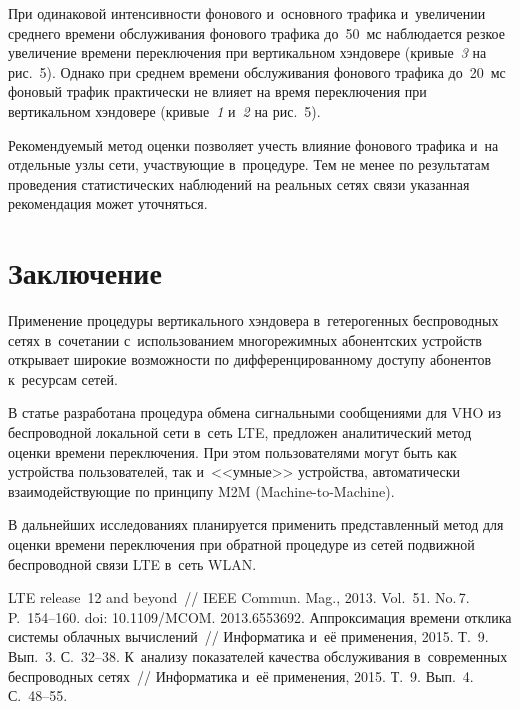 \begin{multicols}{2}
     При одинаковой интенсивности фонового и~основного трафика 
и~увеличении среднего времени обслуживания фонового трафика до~50~мс 
наблюдается резкое увеличение времени переключения при вертикальном 
хэндовере (кривые~\textit{3} на рис.~5). Однако при среднем времени 
обслуживания фонового трафика до~20~мс фоновый трафик практически не 
влияет на время переключения при вертикальном хэндовере 
(кривые~\textit{1} и~\textit{2} на рис.~5).
     
  Рекомендуемый метод оценки позволяет учесть влияние фонового трафика 
  и~на отдельные узлы сети, участвующие в~процедуре. Тем не менее по 
результатам проведения статистических наблюдений на реальных сетях связи 
указанная рекомендация может уточняться.

\section{Заключение}

  Применение процедуры вертикального хэндовера в~гетерогенных 
беспроводных сетях в~сочетании с~использованием многорежимных 
абонентских устройств открывает широкие возможности по 
дифференцированному доступу абонентов к~ресурсам сетей. 
  
  В статье разработана процедура обмена сигнальными сообщениями для VHO 
из беспроводной локальной сети в~сеть LTE, предложен аналитический метод 
оценки времени переключения. При этом пользователями могут быть как 
устройства пользователей, так и~<<умные>> устройства, автоматически 
взаимодействующие по принципу M2M (Machine-to-Machine). 
  
  В дальнейших исследованиях планируется применить представленный метод 
для оценки времени переключения при обратной процедуре из сетей 
подвижной беспроводной связи LTE в~сеть WLAN.
  
{\small\frenchspacing
 {%
 \begin{thebibliography}{99}
 LTE release~12 and 
beyond~// IEEE Commun. Mag., 2013. Vol.~51. No.\,7. P.~154--160.
doi: 10.1109/MCOM. 2013.6553692. 
 Аппроксимация времени отклика системы облачных 
вычислений~// Информатика и~её применения, 2015. Т.~9. Вып.~3. С.~32--38.
 К~анализу 
показателей качества обслуживания в~современных беспроводных сетях~// 
Информатика и~её применения, 2015. Т.~9. Вып.~4. С.~48--55.


\end{thebibliography}}}
\end{multicols}

